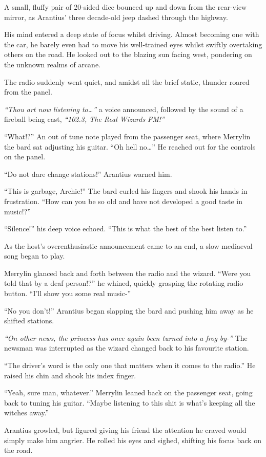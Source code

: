 \noindent A small, fluffy pair of 20-sided dice bounced up and down from the rear-view mirror, as Arantius’ three decade-old jeep dashed through the highway.

His mind entered a deep state of focus whilst driving. Almost becoming one with the car, he barely even had to move his well-trained eyes whilst swiftly overtaking others on the road. He looked out to the blazing sun facing west, pondering on the unknown realms of arcane.

The radio suddenly went quiet, and amidst all the brief static, thunder roared from the panel.

\textit{“Thou art now listening to…”} a voice announced, followed by the sound of a fireball being cast, \textit{“102.3, The Real Wizards FM!”}

“What!?” An out of tune note played from the passenger seat, where Merrylin the bard sat adjusting his guitar. “Oh hell no…” He reached out for the controls on the panel.

“Do not dare change stations!” Arantius warned him.

“This is garbage, Archie!” The bard curled his fingers and shook his hands in frustration. “How can you be so old and have not developed a good taste in music!?”

“Silence!” his deep voice echoed. “This is what the best of the best listen to.”

As the host’s overenthusiastic announcement came to an end, a slow mediaeval song began to play.

Merrylin glanced back and forth between the radio and the wizard. “Were you told that by a deaf person!?” he whined, quickly grasping the rotating radio button. “I’ll show you some real music-”

“No you don’t!” Arantius began slapping the bard and pushing him away as he shifted stations.

\textit{“On other news, the princess has once again been turned into a frog by-”} The newsman was interrupted as the wizard changed back to his favourite station.

“The driver’s word is the only one that matters when it comes to the radio.” He raised his chin and shook his index finger.

“Yeah, sure man, whatever.” Merrylin leaned back on the passenger seat, going back to tuning his guitar. “Maybe listening to this shit is what’s keeping all the witches away.”

Arantius growled, but figured giving his friend the attention he craved would simply make him angrier. He rolled his eyes and sighed, shifting his focus back on the road.

